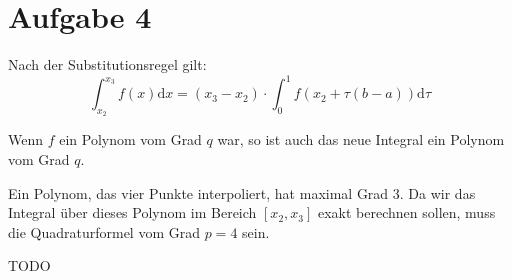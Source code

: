 \section*{Aufgabe 4}
Nach der Substitutionsregel gilt:
\[\int_{x_2}^{x_3} f(x) \mathrm{d}x = (x_3 - x_2) \cdot \int_0^1 f(x_2 + \tau (b-a)) \mathrm{d} \tau\]

Wenn $f$ ein Polynom vom Grad $q$ war, so ist auch das neue Integral ein Polynom
vom Grad $q$.

Ein Polynom, das vier Punkte interpoliert, hat maximal Grad 3.
Da wir das Integral über dieses Polynom im Bereich $[x_2, x_3]$
exakt berechnen sollen, muss die Quadraturformel vom Grad $p=4$ sein.



TODO

